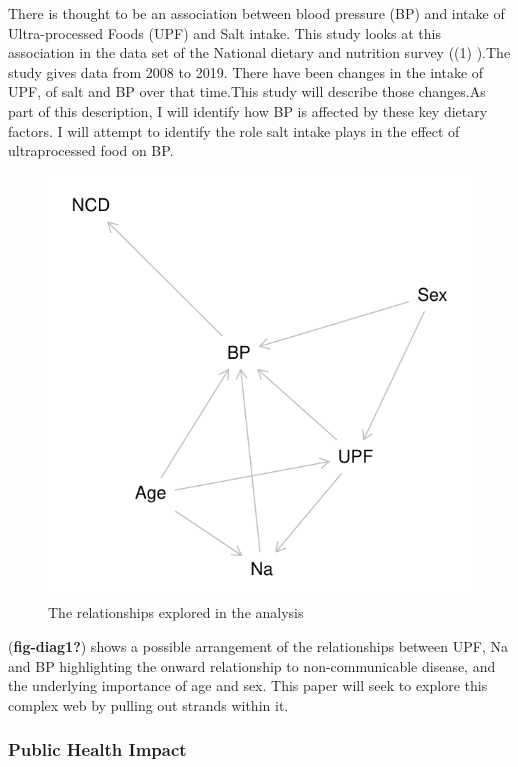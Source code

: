 \documentclass[
]{article}
\begin{document}
There is thought to be an association between blood pressure (BP) and
intake of Ultra-processed Foods (UPF) and Salt intake. This study looks
at this association in the data set of the National dietary and
nutrition survey ((1) ).The study gives data from 2008 to 2019. There
have been changes in the intake of UPF, of salt and BP over that
time.This study will describe those changes.As part of this description,
I will identify how BP is affected by these key dietary factors. I will
attempt to identify the role salt intake plays in the effect of
ultraprocessed food on BP.

\begin{figure}
\centering
\includegraphics{nextlevel_files/figure-latex/fig-diag1-1.pdf}
\caption{The relationships explored in the analysis}
\end{figure}

(\textbf{fig-diag1?}) shows a possible arrangement of the relationships
between UPF, Na and BP highlighting the onward relationship to
non-communicable disease, and the underlying importance of age and sex.
This paper will seek to explore this complex web by pulling out strands
within it.

\hypertarget{public-health-impact}{%
\subsubsection{Public Health Impact}\label{public-health-impact}}
\end{document}
